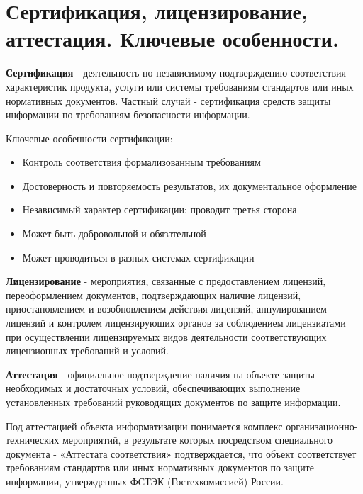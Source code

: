 \section{Сертификация, лицензирование, аттестация. Ключевые особенности.}

\textbf{Сертификация} - деятельность по независимому подтверждению соответствия характеристик продукта, услуги или системы требованиям стандартов или иных нормативных документов.  Частный случай - сертификация средств защиты информации по требованиям безопасности информации.

Ключевые особенности сертификации:

\begin{itemize}
	\item Контроль соответствия формализованным требованиям
	\item Достоверность и повторяемость результатов, их документальное оформление
	\item Независимый характер сертификации: проводит третья сторона
	\item Может быть добровольной и обязательной
	\item Может проводиться в разных системах сертификации
\end{itemize}

\textbf{Лицензирование}  - мероприятия, связанные с предоставлением лицензий, переоформлением документов, подтверждающих наличие лицензий, приостановлением и возобновлением действия лицензий, аннулированием лицензий и контролем лицензирующих органов за соблюдением лицензиатами при осуществлении лицензируемых видов деятельности соответствующих лицензионных требований и условий.

\textbf{Аттестация} - официальное подтверждение наличия на объекте защиты необходимых и достаточных условий, обеспечивающих выполнение установленных требований руководящих документов по защите информации.

Под аттестацией объекта информатизации понимается комплекс организационно-технических мероприятий, в результате которых посредством специального документа - «Аттестата соответствия» подтверждается, что объект соответствует требованиям стандартов или иных нормативных документов по защите информации, утвержденных ФСТЭК (Гостехкомиссией) России.